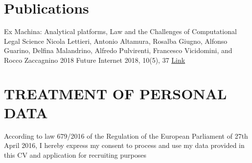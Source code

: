 \documentclass[%
               doublesided,
               paper=a4,
               fontsize=10pt
              ]{my-resume}
\begin{document}
\section{Publications}
\pubforcefullwidth
\begin{comment}


Demonstrate what an \texttt{\textbackslash pagestyle\{empty\}} page looks like.
Also show off the macros for publications that uses small icons for authors, date, journal and links.

Achieving a good looking spacing can be tricky. For empty pagestyles where the full width is available use \texttt{\textbackslash pubforcefullwidth} to force the publoication list to take up all the available space.
The (relative) lengths reserved for date, journal and links can be set with the parameters \texttt{\textbackslash pubdatelength}, \texttt{\textbackslash pubjournallength} and \texttt{\textbackslash publinklength} as in \texttt{\textbackslash setlength\{\textbackslash pubdatelength\}\{0.15 \textbackslash linewidth\}}.
\bigskip
\end{comment}
\publication
	{Ex Machina: Analytical platforms, Law and the Challenges of Computational Legal Science} %
	{Nicola Lettieri, Antonio Altamura, Rosalba Giugno, Alfonso Guarino, Delfina Malandrino, Alfredo Pulvirenti, Francesco Vicidomini, and Rocco Zaccagnino} %
	{2018} %
	{Future Internet 2018, 10(5), 37} %
	{\href{https://www.mdpi.com/1999-5903/10/5/37}{Link}} %
\section{TREATMENT OF PERSONAL DATA}
According to law 679/2016 of the Regulation of the European Parliament of 27th April 2016, I hereby express my consent to process and use my data provided in this CV and application for recruiting purposes
\end{document}
